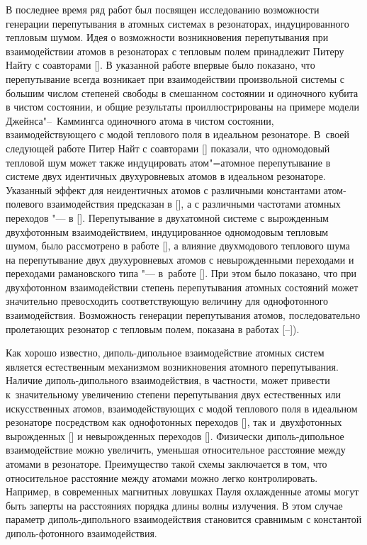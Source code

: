 В последнее время ряд работ  был посвящен исследованию возможности генерации перепутывания в атомных системах в резонаторах, индуцированного тепловым шумом. Идея о возможности возникновения перепутывания при взаимодействии атомов в резонаторах с тепловым полем принадлежит Питеру Найту с соавторами  [].  В указанной работе  впервые было показано, что перепутывание всегда возникает при  взаимодействии произвольной системы  с большим числом степеней свободы в смешанном состоянии и одиночного кубита в чистом состоянии, и  общие результаты проиллюстрированы на примере модели Джейнса"--~Каммингса одиночного атома в чистом состоянии,  взаимодействующего с модой  теплового поля в идеальном резонаторе. В~своей следующей работе Питер Найт с соавторами [] показали, что одномодовый тепловой шум может также индуцировать атом"=атомное перепутывание в системе двух идентичных двухуровневых атомов в идеальном резонаторе. Указанный эффект для неидентичных атомов с различными константами атом-полевого взаимодействия предсказан в [], а с различными частотами атомных переходов "--- в [].  Перепутывание в двухатомной системе с   вырожденным двухфотонным взаимодействием, индуцированное одномодовым тепловым шумом,  было рассмотрено  в работе [], а  влияние двухмодового теплового шума на перепутывание двух двухуровневых атомов с невырожденными переходами и переходами рамановского типа "--- в~работе []. При этом   было показано, что при двухфотонном взаимодействии степень перепутывания атомных  состояний может значительно превосходить  соответствующую величину для однофотонного взаимодействия. Возможность генерации перепутывания атомов, последовательно пролетающих резонатор с тепловым полем, показана в работах [--]).



Как хорошо известно, диполь-дипольное взаимодействие атомных систем является естественным механизмом возникновения атомного перепутывания. Наличие диполь-дипольного взаимодействия, в частности, может привести к~значительному увеличению степени  перепутывания двух естественных или искусственных атомов, взаимодействующих с модой теплового поля в идеальном резонаторе посредством как  однофотонных переходов [], так и~двухфотонных вырожденных [] и невырожденных переходов []. Физически диполь-дипольное взаимодействие  можно увеличить, уменьшая относительное расстояние между атомами в резонаторе. Преимущество такой схемы заключается в том, что относительное расстояние между атомами можно легко контролировать. Например, в современных магнитных ловушках Пауля охлажденные атомы могут быть заперты на расстояниях порядка длины волны излучения.  В этом случае параметр диполь-дипольного взаимодействия становится сравнимым с константой диполь-фотонного взаимодействия. 

